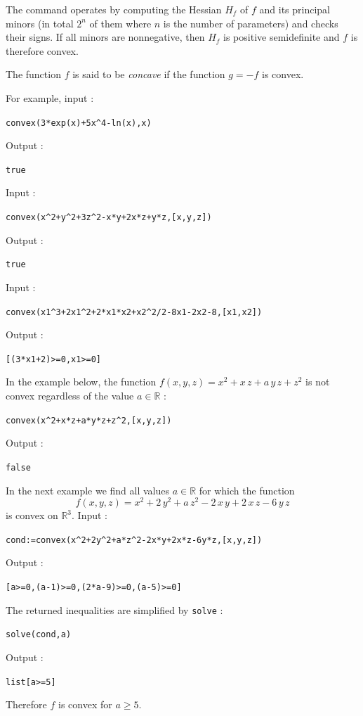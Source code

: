 \documentclass[a4paper,11pt]{book}
\begin{document}
The command operates by computing the Hessian $H_f$ of $f$ and its principal minors (in total $2^n$ of them where $n$ is the number of parameters) and checks their signs. If all minors are nonnegative, then $H_f$ is positive semidefinite and $f$ is therefore convex.

The function $f$ is said to be \emph{concave} if the function $g=-f$ is convex.

For example, input :
\begin{center}
  \tt convex(3*exp(x)+5x\verb|^|4-ln(x),x)
\end{center}
Output :
\begin{center}
  \tt true
\end{center}
Input :
\begin{center}
  \tt convex(x\verb|^|2+y\verb|^|2+3z\verb|^|2-x*y+2x*z+y*z,[x,y,z])
\end{center}
Output :
\begin{center}
  \tt true
\end{center}
Input :
\begin{center}
  \tt convex(x1\verb|^|3+2x1\verb|^|2+2*x1*x2+x2\verb|^|2/2-8x1-2x2-8,[x1,x2])
\end{center}
Output :
\begin{center}
  \tt [(3*x1+2)>=0,x1>=0]
\end{center}
In the example below, the function $f(x,y,z)=x^2+x\,z+a\,y\,z+z^2$ is not convex regardless of the value $a\in\mathbb{R}$ :
\begin{center}
  \tt convex(x\verb|^|2+x*z+a*y*z+z\verb|^|2,[x,y,z])
\end{center}
Output :
\begin{center}
  \tt false
\end{center}
In the next example we find all values $a\in\mathbb{R}$ for which the function \[f(x,y,z)=x^2+2\,y^2+a\,z^2-2\,x\,y+2\,x\,z-6\,y\,z\] is convex on $\mathbb{R}^3$. Input :
\begin{center}
  \tt cond:=convex(x\verb|^|2+2y\verb|^|2+a*z\verb|^|2-2x*y+2x*z-6y*z,[x,y,z])
\end{center}
Output :
\begin{center}
  \tt [a>=0,(a-1)>=0,(2*a-9)>=0,(a-5)>=0]
\end{center}
The returned inequalities are simplified by {\tt solve} :
\begin{center}
  \tt solve(cond,a)
\end{center}
Output :
\begin{center}
  \tt list[a>=5]
\end{center}
Therefore $f$ is convex for $a\geq 5$.
\end{document}
